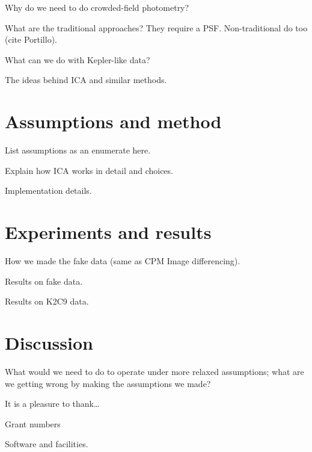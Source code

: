 \documentclass[modern]{aastex61}
\begin{document}
Why do we need to do crowded-field photometry?

What are the traditional approaches? They require a
PSF. Non-traditional do too (cite Portillo).

What can we do with Kepler-like data?

The ideas behind ICA and similar methods.

\section{Assumptions and method}

List assumptions as an enumerate here.

Explain how ICA works in detail and choices.

Implementation details.

\section{Experiments and results}

How we made the fake data (same as CPM Image differencing).

Results on fake data.

Results on K2C9 data.

\section{Discussion}

What would we need to do to operate under more relaxed assumptions; what are
we getting wrong by making the assumptions we made?

\acknowledgements
It is a pleasure to thank\ldots

Grant numbers

Software and facilities.
\end{document}
